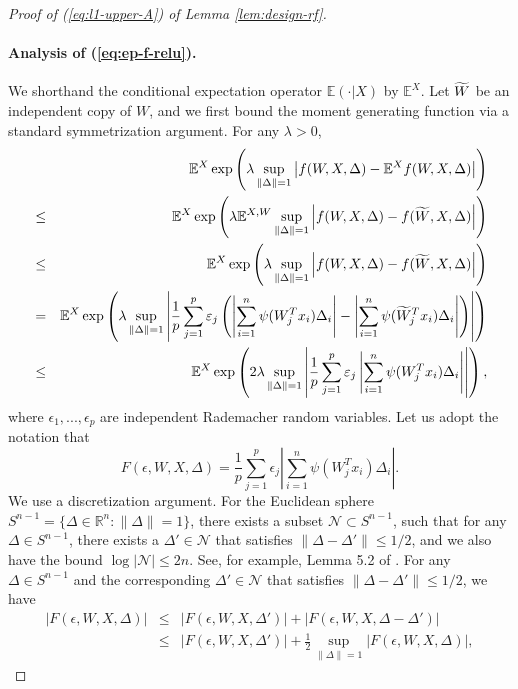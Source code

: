 \begin{proof}[Proof of (\ref{eq:l1-upper-A}) of Lemma \ref{lem:design-rf}]
\paragraph{Analysis of (\ref{eq:ep-f-relu}).} We shorthand the conditional expectation operator $\mathbb{E}(\cdot|X)$ by $\mathbb{E}^X$. Let $\widetilde{W}$ be an independent copy of $W$, and we first bound the moment generating function via a standard symmetrization argument. For any $\lambda>0$,
\begin{eqnarray}
\nonumber && \mathbb{E}^X\exp\left(\lambda \sup_{\|\Delta\|=1}\left|f(W,X,\Delta)-\mathbb{E}^Xf(W,X,\Delta)\right|\right) \\
\nonumber &\leq& \mathbb{E}^X\exp\left(\lambda \mathbb{E}^{X,W}\sup_{\|\Delta\|=1}\left|f(W,X,\Delta)-f(\wt{W},X,\Delta)\right|\right) \\
\nonumber &\leq& \mathbb{E}^X\exp\left(\lambda \sup_{\|\Delta\|=1}\left|f(W,X,\Delta)-f(\wt{W},X,\Delta)\right|\right) \\
\nonumber &=& \mathbb{E}^X\exp\left(\lambda\sup_{\|\Delta\|=1}\left|\frac{1}{p}\sum_{j=1}^p\epsilon_j\left(\left|\sum_{i=1}^n\psi(W_j^Tx_i)\Delta_i\right|-\left|\sum_{i=1}^n\psi(\wt{W}_j^Tx_i)\Delta_i\right|\right)\right|\right) \\
\label{eq:mgf-b-relu} &\leq& \mathbb{E}^X\exp\left(2\lambda\sup_{\|\Delta\|=1}\left|\frac{1}{p}\sum_{j=1}^p\epsilon_j\left|\sum_{i=1}^n\psi(W_j^Tx_i)\Delta_i\right|\right|\right),
\end{eqnarray}
where $\epsilon_1,...,\epsilon_p$ are independent Rademacher random variables. Let us adopt the notation that
$$F(\epsilon,W,X,\Delta)=\frac{1}{p}\sum_{j=1}^p\epsilon_j\left|\sum_{i=1}^n\psi(W_j^Tx_i)\Delta_i\right|.$$
We use a discretization argument. For the Euclidean sphere $S^{n-1}=\{\Delta\in\mathbb{R}^n: \|\Delta\|=1\}$, there exists a subset $\mathcal{N}\subset S^{n-1}$, such that for any $\Delta\in S^{n-1}$, there exists a $\Delta'\in\mathcal{N}$ that satisfies $\|\Delta-\Delta'\|\leq 1/2$, and we also have the bound $\log|\mathcal{N}|\leq 2n$. See, for example, Lemma 5.2 of \cite{vershynin2010introduction}.
For any $\Delta\in S^{n-1}$ and the corresponding $\Delta'\in\mathcal{N}$ that satisfies $\|\Delta-\Delta'\|\leq 1/2$, we have
\begin{eqnarray*}
|F(\epsilon,W,X,\Delta)| &\leq& |F(\epsilon,W,X,\Delta')| + |F(\epsilon,W,X,\Delta-\Delta')| \\
&\leq& |F(\epsilon,W,X,\Delta')| + \frac{1}{2}\sup_{\|\Delta\|=1}|F(\epsilon,W,X,\Delta)|,
\end{eqnarray*}

\end{proof}
